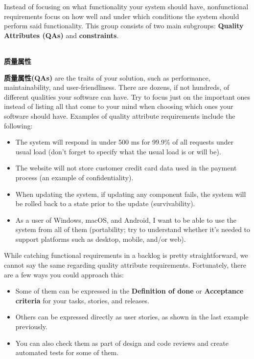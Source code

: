 Instead of focusing on what functionality your system should have, nonfunctional requirements focus on how well and under which conditions the system should perform said functionality. This group consists of two main subgroups: \textbf{Quality Attributes (QAs)} and \textbf{constraints}.

\hspace*{\fill} \\ %
\noindent
\textbf{质量属性}

\textbf{质量属性(QAs)} are the traits of your solution, such as performance, maintainability, and user-friendliness. There are dozens, if not hundreds, of different qualities your software can have. Try to focus just on the important ones instead of listing all that come to your mind when choosing which ones your software should have. Examples of quality attribute requirements include the following:

\begin{itemize}
\item 
The system will respond in under 500 ms for 99.9\% of all requests under usual load (don't forget to specify what the usual load is or will be).

\item 
The website will not store customer credit card data used in the payment process (an example of confidentiality).

\item
When updating the system, if updating any component fails, the system will be rolled back to a state prior to the update (survivability).

\item 
As a user of Windows, macOS, and Android, I want to be able to use the system from all of them (portability; try to understand whether it's needed to support platforms such as desktop, mobile, and/or web).
\end{itemize}

While catching functional requirements in a backlog is pretty straightforward, we cannot say the same regarding quality attribute requirements. Fortunately, there are a few ways you could approach this:

\begin{itemize}
\item 
Some of them can be expressed in the \textbf{Definition of done} or \textbf{Acceptance criteria} for your tasks, stories, and releases.

\item 
Others can be expressed directly as user stories, as shown in the last example previously.

\item 
You can also check them as part of design and code reviews and create automated tests for some of them.
\end{itemize}

